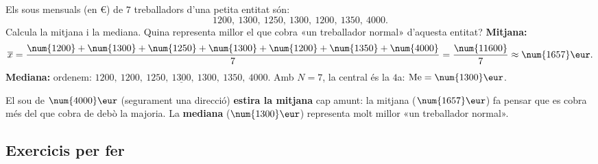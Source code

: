 \begin{exresolt}
Els sous mensuals (en €) de $7$ treballadors d'una petita entitat són:
\[
\num{1200},\ \num{1300},\ \num{1250},\ \num{1300},\ \num{1200},\ \num{1350},\ \num{4000}.
\]
Calcula la mitjana i la mediana. Quina representa millor el que cobra «un treballador
normal» d'aquesta entitat?
\solucio
\textbf{Mitjana:}
\[
\overline{x}=\frac{\num{1200}+\num{1300}+\num{1250}+\num{1300}+\num{1200}+\num{1350}+\num{4000}}{7}
=\frac{\num{11600}}{7}\approx \num{1657}\eur.
\]
\textbf{Mediana:} ordenem:
$\num{1200},\ \num{1200},\ \num{1250},\ \underline{\num{1300}},\ \num{1300},\ \num{1350},\ \num{4000}$.
Amb $N=7$, la central és la $4$a: $\text{Me}=\num{1300}\eur$.

El sou de $\num{4000}\eur$ (segurament una direcció) \textbf{estira la mitjana} cap
amunt: la mitjana ($\num{1657}\eur$) fa pensar que es cobra més del que cobra de
debò la majoria. La \textbf{mediana} ($\num{1300}\eur$) representa molt millor «un
treballador normal».
\end{exresolt}

\subsection{Exercicis per fer}


